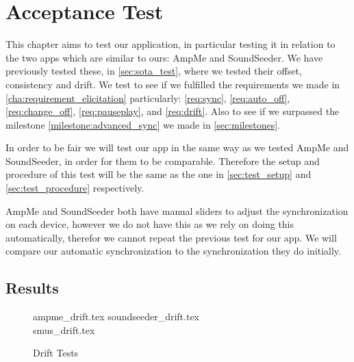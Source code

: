 \chapter{Acceptance Test}\label{cha:acctest}
This chapter aims to test our application, in particular testing it in relation to the two apps which are similar to ours: AmpMe and SoundSeeder.
We have previously tested these, in \vref{sec:sota_test}, where we tested their offset, consistency and drift.
We test to see if we fulfilled the requirements we made in \vref{cha:requirement_elicitation} particularly: \ref{req:sync}, \ref{req:auto_off}, \ref{req:change_off}, \ref{req:pauseplay}, and \ref{req:drift}.
Also to see if we surpassed the milestone \ref{milestone:advanced_sync} we made in \vref{sec:milestones}.

In order to be fair we will test our app in the same way as we tested AmpMe and SoundSeeder, in order for them to be comparable.
Therefore the setup and procedure of this test will be the same as the one in \vref{sec:test_setup} and \vref{sec:test_procedure} respectively.

AmpMe and SoundSeeder both have manual sliders to adjust the synchronization on each device, however we do not have this as we rely on doing this automatically, therefor we cannot repeat the previous test for our app.
We will compare our automatic synchronization to the synchronization they do initially.

\section{Results}


\begin{figure}[pht]%
{ampme_drift.tex}%
{soundseeder_drift.tex}%
\\[3ex]%
{smus_drift.tex}%
\caption{Drift Tests}%
\label{fig:test}%
\end{figure}

